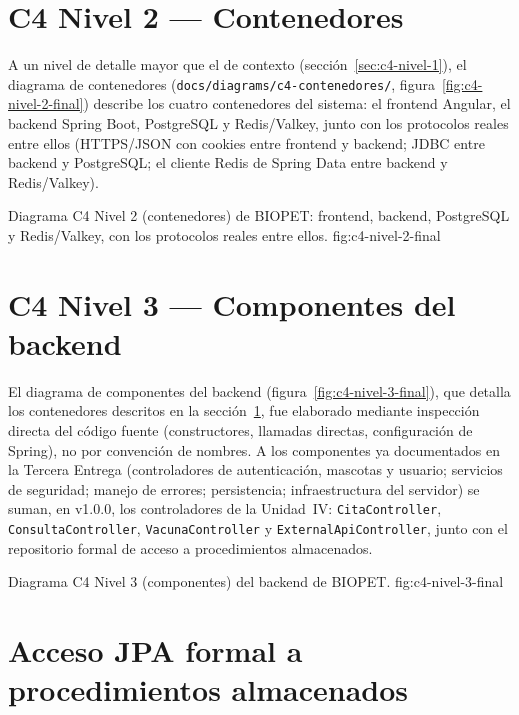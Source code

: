 \section{C4 Nivel 2 --- Contenedores}
\label{sec:c4-nivel-2}

A un nivel de detalle mayor que el de contexto
(secci\'on~\ref{sec:c4-nivel-1}), el diagrama de contenedores
(\texttt{docs/diagrams/c4-contenedores/},
figura~\ref{fig:c4-nivel-2-final}) describe los cuatro contenedores del
sistema: el frontend Angular, el backend Spring Boot, PostgreSQL y
Redis/Valkey, junto con los protocolos reales entre ellos (HTTPS/JSON con
cookies entre frontend y backend; JDBC entre backend y PostgreSQL; el
cliente Redis de Spring Data entre backend y Redis/Valkey).

%
{Diagrama C4 Nivel 2 (contenedores) de BIOPET: frontend, backend, PostgreSQL y Redis/Valkey, con los protocolos reales entre ellos.}%
{fig:c4-nivel-2-final}

\section{C4 Nivel 3 --- Componentes del backend}
\label{sec:c4-nivel-3}

El diagrama de componentes del backend (figura~\ref{fig:c4-nivel-3-final}), que detalla los contenedores descritos en la secci\'on~\ref{sec:c4-nivel-2},
fue elaborado mediante inspecci\'on directa del c\'odigo fuente
(constructores, llamadas directas, configuraci\'on de Spring), no por
convenci\'on de nombres. A los
componentes ya documentados en la Tercera Entrega (controladores de
autenticaci\'on, mascotas y usuario; servicios de seguridad; manejo de
errores; persistencia; infraestructura del servidor) se suman, en v1.0.0,
los controladores de la Unidad~IV: \texttt{CitaController},
\texttt{ConsultaController}, \texttt{VacunaController} y
\texttt{ExternalApiController}, junto con el repositorio formal de acceso a
procedimientos almacenados.

%
{Diagrama C4 Nivel 3 (componentes) del backend de BIOPET.}%
{fig:c4-nivel-3-final}

\section{Acceso JPA formal a procedimientos almacenados}
\label{sec:acceso-jpa-formal}

